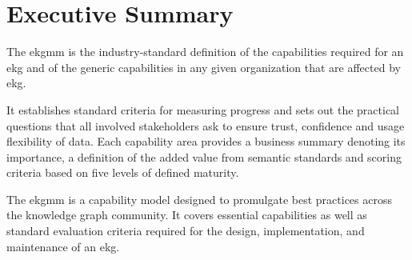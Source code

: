 \chapter{Executive Summary}\label{ch:ekg-mm-executive-summary}

The \gls{ekgmm} is the industry-standard definition of the capabilities required for an \gls{ekg} and
of the generic capabilities in any given organization that are affected by \gls{ekg}.

It establishes standard criteria for measuring progress and sets out the practical questions that all involved
stakeholders ask to ensure trust, confidence and usage flexibility of data.
Each capability area provides a business summary denoting its importance, a definition of the added value from
semantic standards and scoring criteria based on five levels of defined maturity.

The \gls{ekgmm} is a capability model designed to promulgate best practices across the knowledge graph community.
It covers essential capabilities as well as standard evaluation criteria required for the design, implementation,
and maintenance of an \gls{ekg}.
